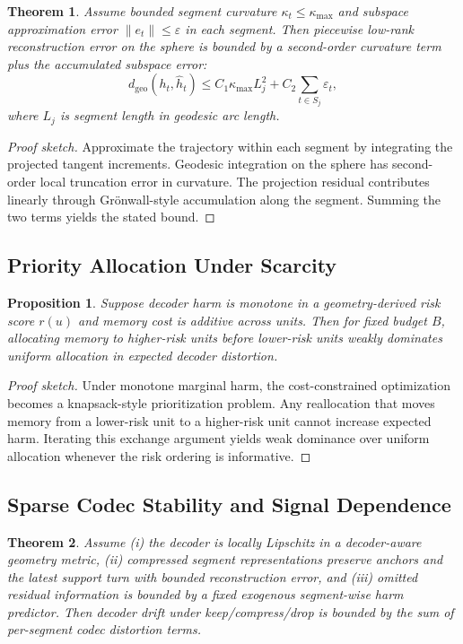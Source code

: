 \documentclass[conference]{IEEEtran}
\newtheorem{proposition}{Proposition}
\newtheorem{theorem}{Theorem}
\newcommand{\Geo}{d_{\mathrm{geo}}}
\begin{document}
\begin{theorem}
Assume bounded segment curvature $\kappa_t \leq \kappa_{\max}$ and subspace approximation error $\lVert e_t \rVert \leq \varepsilon$ in each segment. Then piecewise low-rank reconstruction error on the sphere is bounded by a second-order curvature term plus the accumulated subspace error:
\begin{equation}
\Geo(h_t,\widehat{h}_t)
\leq
C_1 \kappa_{\max} L_j^2 + C_2 \sum_{t \in S_j} \varepsilon_t,
\end{equation}
where $L_j$ is segment length in geodesic arc length.
\end{theorem}

\begin{proof}[Proof sketch]
Approximate the trajectory within each segment by integrating the projected tangent increments. Geodesic integration on the sphere has second-order local truncation error in curvature. The projection residual contributes linearly through Gr\"onwall-style accumulation along the segment. Summing the two terms yields the stated bound.
\end{proof}

\subsection{Priority Allocation Under Scarcity}
\begin{proposition}
Suppose decoder harm is monotone in a geometry-derived risk score $r(u)$ and memory cost is additive across units. Then for fixed budget $B$, allocating memory to higher-risk units before lower-risk units weakly dominates uniform allocation in expected decoder distortion.
\end{proposition}

\begin{proof}[Proof sketch]
Under monotone marginal harm, the cost-constrained optimization becomes a knapsack-style prioritization problem. Any reallocation that moves memory from a lower-risk unit to a higher-risk unit cannot increase expected harm. Iterating this exchange argument yields weak dominance over uniform allocation whenever the risk ordering is informative.
\end{proof}

\subsection{Sparse Codec Stability and Signal Dependence}
\begin{theorem}
Assume (i) the decoder is locally Lipschitz in a decoder-aware geometry metric, (ii) compressed segment representations preserve anchors and the latest support turn with bounded reconstruction error, and (iii) omitted residual information is bounded by a fixed exogenous segment-wise harm predictor. Then decoder drift under keep/compress/drop is bounded by the sum of per-segment codec distortion terms.
\end{theorem}
\end{document}
